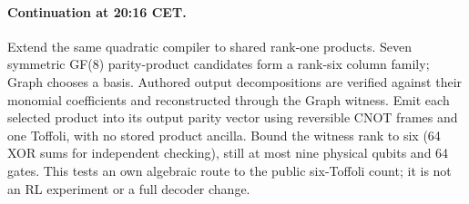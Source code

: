 \documentclass{article}
\begin{document}
\paragraph{Continuation at 20:16 CET.} Extend the same quadratic compiler to
shared rank-one products. Seven symmetric GF(8) parity-product candidates form
a rank-six column family; Graph chooses a basis. Authored output decompositions
are verified against their monomial coefficients and reconstructed through the
Graph witness. Emit each selected product into its output parity vector using
reversible CNOT frames and one Toffoli, with no stored product ancilla. Bound the
witness rank to six (64 XOR sums for independent checking), still at most nine
physical qubits and 64 gates. This tests an own algebraic route to the public
six-Toffoli count; it is not an RL experiment or a full decoder change.
\begin{center}\end{center}
\end{document}

